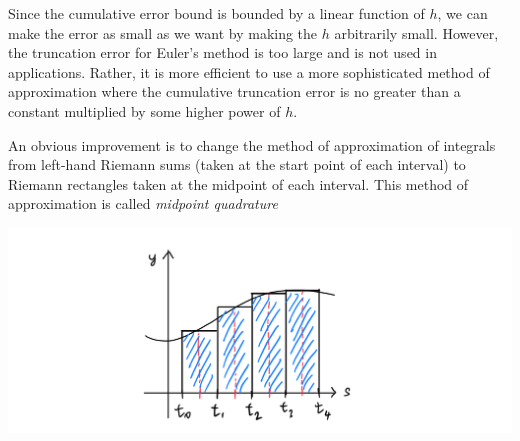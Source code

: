 \documentclass{article}
\theoremstyle{remark}
\theoremstyle{definition}
\begin{document}
    Since the cumulative error bound is bounded by a linear function of $h$, we can make the error as small as we want by making the $h$ arbitrarily small. However, the truncation error for Euler's method is too large and is not used in applications. Rather, it is more efficient to use a more sophisticated method of approximation where the cumulative truncation error is no greater than a constant multiplied by some higher power of $h$. 

    An obvious improvement is to change the method of approximation of integrals from left-hand Riemann sums (taken at the start point of each interval) to Riemann rectangles taken at the midpoint of each interval. This method of approximation is called \textit{midpoint quadrature}
    \begin{center}
        \includegraphics[scale=0.28]{img/Midpoint_Quadrature.PNG}
    \end{center}
\end{document}
